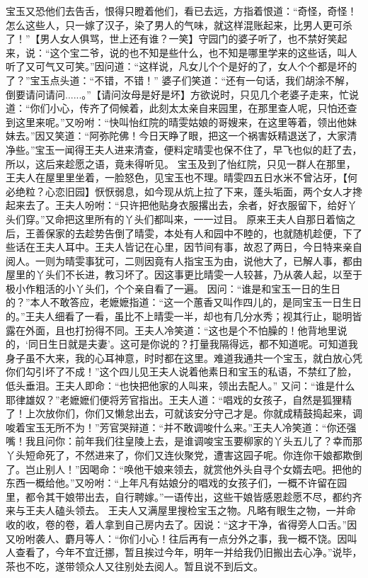 \documentclass[12pt,oneside]{book}
\begin{document}
宝玉又恐他们去告舌，恨得只瞪着他们，看已去远，方指着恨道：“奇怪，奇怪！怎么这些人，只一嫁了汉子，染了男人的气味，就这样混账起来，比男人更可杀了！”【男人女人俱骂，世上还有谁？一笑】守园门的婆子听了，也不禁好笑起来，说：“这个宝二爷，说的也不知是些什么，也不知是哪里学来的这些话，叫人听了又可气又可笑。”因问道：“这样说，凡女儿个个是好的了，女人个个都是坏的了？”宝玉点头道：“不错，不错！”
婆子们笑道：“还有一句话，我们胡涂不解，倒要请问请问......。”【请问汝母是好是坏】方欲说时，只见几个老婆子走来，忙说道：“你们小心，传齐了伺候着，此刻太太亲自来园里，在那里查人呢，只怕还查到这里来呢。”又吩咐：“快叫怡红院的晴雯姑娘的哥嫂来，在这里等着，领出他妹妹去。”因又笑道：“阿弥陀佛！今日天睁了眼，把这一个祸害妖精退送了，大家清净些。”宝玉一闻得王夫人进来清查，便料定晴雯也保不住了，早飞也似的赶了去，所以，这后来趁愿之语，竟未得听见。
宝玉及到了怡红院，只见一群人在那里，王夫人在屋里里坐着，一脸怒色，见宝玉也不理。晴雯四五日水米不曾沾牙，【何必绝粒？心恋旧园】恹恹弱息，如今现从炕上拉了下来，蓬头垢面，两个女人才搀起来去了。王夫人吩咐：“只许把他贴身衣服撂出去，余者，好衣服留下，给好丫头们穿。”又命把这里所有的丫头们都叫来，一一过目。
原来王夫人自那日着恼之后，王善保家的去趁势告倒了晴雯，本处有人和园中不睦的，也就随机趁便，下了些话在王夫人耳中。王夫人皆记在心里，因节间有事，故忍了两日，今日特来亲自阅人。一则为晴雯事犹可，二则因竟有人指宝玉为由，说他大了，已解人事，都由屋里的丫头们不长进，教习坏了。因这事更比晴雯一人较甚，乃从袭人起，以至于极小作粗活的小丫头们，个个亲自看了一遍。
因问：“谁是和宝玉一日的生日的？”本人不敢答应，老嬷嬷指道：“这一个蕙香又叫作四儿的，是同宝玉一日生日的。”王夫人细看了一看，虽比不上晴雯一半，却也有几分水秀；视其行止，聪明皆露在外面，且也打扮得不同。王夫人冷笑道：“这也是个不怕臊的！他背地里说的，‘同日生日就是夫妻’。这可是你说的？打量我隔得远，都不知道呢。可知道我身子虽不大来，我的心耳神意，时时都在这里。难道我通共一个宝玉，就白放心凭你们勾引坏了不成！”这个四儿见王夫人说着他素日和宝玉的私语，不禁红了脸，低头垂泪。王夫人即命：“也快把他家的人叫来，领出去配人。”
又问：“谁是什么耶律雄奴？”老嬷嬷们便将芳官指出。王夫人道：“唱戏的女孩子，自然是狐狸精了！上次放你们，你们又懒怠出去，可就该安分守己才是。你就成精鼓捣起来，调唆着宝玉无所不为！”芳官哭辩道：“并不敢调唆什么来。”王夫人冷笑道：“你还强嘴！我且问你：前年我们往皇陵上去，是谁调唆宝玉要柳家的丫头五儿了？幸而那丫头短命死了，不然进来了，你们又连伙聚党，遭害这园子呢。你连你干娘都欺倒了。岂止别人！”因喝命：“唤他干娘来领去，就赏他外头自寻个女婿去吧。把他的东西一概给他。”又吩咐：“上年凡有姑娘分的唱戏的女孩子们，一概不许留在园里，都令其干娘带出去，自行聘嫁。”一语传出，这些干娘皆感恩趁愿不尽，都约齐来与王夫人磕头领去。
王夫人又满屋里搜检宝玉之物。凡略有眼生之物，一并命收的收，卷的卷，着人拿到自己房内去了。因说：“这才干净，省得旁人口舌。”因又吩咐袭人、麝月等人：“你们小心！往后再有一点分外之事，我一概不饶。因叫人查看了，今年不宜迁挪，暂且挨过今年，明年一并给我仍旧搬出去心净。”说毕，茶也不吃，遂带领众人又往别处去阅人。暂且说不到后文。
\end{document}
